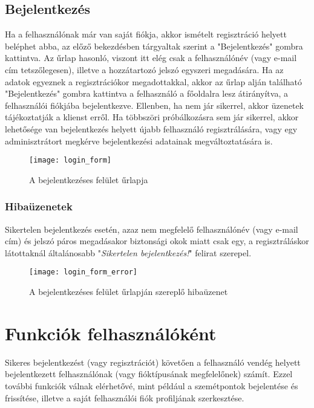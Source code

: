 \subsection{Bejelentkezés}
\label{subsec:login}

Ha a felhasználónak már van saját fiókja, akkor ismételt regisztráció helyett beléphet abba, az előző bekezdésben tárgyaltak szerint a "Bejelentkezés" gombra kattintva. Az űrlap hasonló, viszont itt elég csak a felhasználónév (vagy e-mail cím tetszőlegesen), illetve a hozzátartozó jelszó egyszeri megadására. Ha az adatok egyeznek a regisztrációkor megadottakkal, akkor az űrlap alján található "Bejelentkezés" gombra kattintva a felhasználó a főoldalra lesz átirányítva, a felhasználói fiókjába bejelentkezve. Ellenben, ha nem jár sikerrel, akkor üzenetek tájékoztatják a klienst erről. Ha többszöri próbálkozásra sem jár sikerrel, akkor lehetősége van bejelentkezés helyett újabb felhasználó regisztrálására, vagy egy adminisztrátort megkérve bejelentkezési adatainak megváltoztatására is.

\begin{figure}[H]
	\centering
	\texttt{[image: login\_form]}
	\caption{A bejelentkezéses felület űrlapja}
	\label{fig:login_form}
\end{figure}

\subsubsection{Hibaüzenetek}

Sikertelen bejelentkezés esetén, azaz nem megfelelő felhasználónév (vagy e-mail cím) és jelszó páros megadásakor biztonsági okok miatt csak egy, a regisztráláskor látottaknál általánosabb "\textit{Sikertelen bejelentkezés!}" felirat szerepel.

\begin{figure}[H]
	\centering
	\texttt{[image: login\_form\_error]}
	\caption{A bejelentkezéses felület űrlapján szereplő hibaüzenet}
	\label{fig:login_form_error}
\end{figure}

\section{Funkciók felhasználóként}

Sikeres bejelentkezést (vagy regisztrációt) követően a felhasználó vendég helyett bejelentkezett felhasználónak (vagy fióktípusának megfelelőnek) számít. Ezzel további funkciók válnak elérhetővé, mint például a szemétpontok bejelentése és frissítése, illetve a saját felhasználói fiók profiljának szerkesztése.

